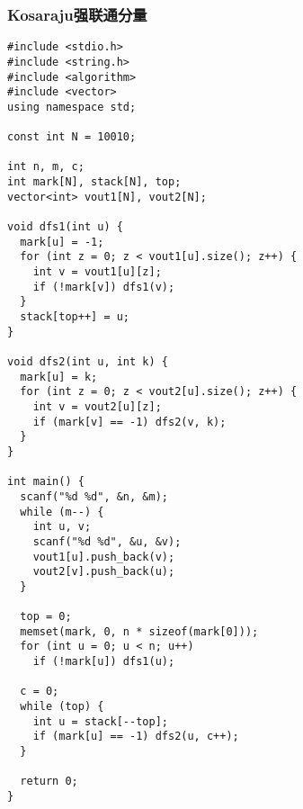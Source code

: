 \subsubsection{Kosaraju强联通分量}
\begin{verbatim}
#include <stdio.h>
#include <string.h>
#include <algorithm>
#include <vector>
using namespace std;

const int N = 10010;

int n, m, c;
int mark[N], stack[N], top;
vector<int> vout1[N], vout2[N];

void dfs1(int u) {
  mark[u] = -1;
  for (int z = 0; z < vout1[u].size(); z++) {
    int v = vout1[u][z];
    if (!mark[v]) dfs1(v);
  }
  stack[top++] = u;
}

void dfs2(int u, int k) {
  mark[u] = k;
  for (int z = 0; z < vout2[u].size(); z++) {
    int v = vout2[u][z];
    if (mark[v] == -1) dfs2(v, k);
  }
}

int main() {
  scanf("%d %d", &n, &m);
  while (m--) {
    int u, v;
    scanf("%d %d", &u, &v);
    vout1[u].push_back(v);
    vout2[v].push_back(u);
  }
    
  top = 0;
  memset(mark, 0, n * sizeof(mark[0]));
  for (int u = 0; u < n; u++)
    if (!mark[u]) dfs1(u);
  
  c = 0;
  while (top) {
    int u = stack[--top];
    if (mark[u] == -1) dfs2(u, c++);
  }
  
  return 0;
}
\end{verbatim}
